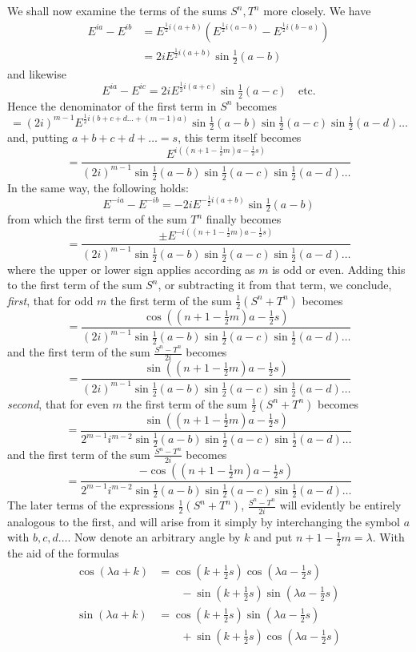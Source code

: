 We shall now examine the terms of the sums $S^n,T^n$ more closely. We have
\[
\begin{aligned}E^{ia}-E^{ib}&=E^{\frac12i(a+b)}(E^{\frac12i(a-b)}-E^{\frac12i(b-a)})\\
&=2iE^{\frac12i(a+b)}\sin\tfrac12(a-b)\end{aligned}
\]
and likewise
\[
E^{ia}-E^{ic}=2iE^{\frac12i(a+c)}\sin\tfrac12(a-c)\quad\text{etc.}
\]
Hence the denominator of the first term in $S^n$ becomes
\[
=(2i)^{m-1}E^{\frac12i(b+c+d\ldots+(m-1)a)}\sin\tfrac12(a-b)\sin\tfrac12(a-c)\sin\tfrac12(a-d)\ldots
\]
and, putting $a+b+c+d+\ldots=s$, this term itself becomes
\[
=\frac{E^{i((n+1-\frac12m)a-\frac12s)}}{(2i)^{m-1}\sin\tfrac12(a-b)\sin\tfrac12(a-c)\sin\tfrac12(a-d)\ldots}
\]
In the same way, the following holds:
\[
E^{-ia}-E^{-ib}=-2iE^{-\frac12i(a+b)}\sin\tfrac12(a-b)
\]
from which the first term of the sum $T^n$ finally becomes
\[
=\frac{\pm E^{-i((n+1-\frac12m)a-\frac12s)}}{(2i)^{m-1}\sin\tfrac12(a-b)\sin\tfrac12(a-c)\sin\tfrac12(a-d)\ldots}
\]
where the upper or lower sign applies according as $m$ is odd or even. Adding this to the first term of the sum $S^n$, or subtracting it from that term, we conclude, \textit{first}, that for odd $m$ the first term of the sum $\frac12(S^n+T^n)$ becomes
\[
=\frac{\cos((n+1-\frac12m)a-\frac12s)}{(2i)^{m-1}\sin\tfrac12(a-b)\sin\tfrac12(a-c)\sin\tfrac12(a-d)\ldots}
\]
and the first term of the sum $\frac{S^n-T^n}{2i}$ becomes
\[
=\frac{\sin((n+1-\frac12m)a-\frac12s)}{(2i)^{m-1}\sin\tfrac12(a-b)\sin\tfrac12(a-c)\sin\tfrac12(a-d)\ldots}
\]
\textit{second}, that for even $m$ the first term of the sum $\frac12(S^n+T^n)$ becomes
\[
=\frac{\sin((n+1-\frac12m)a-\frac12s)}{2^{m-1}i^{m-2}\sin\tfrac12(a-b)\sin\tfrac12(a-c)\sin\tfrac12(a-d)\ldots}
\]
and the first term of the sum $\frac{S^n-T^n}{2i}$ becomes
\[
=\frac{-\cos((n+1-\frac12m)a-\frac12s)}{2^{m-1}i^{m-2}\sin\tfrac12(a-b)\sin\tfrac12(a-c)\sin\tfrac12(a-d)\ldots}
\]
The later terms of the expressions $\frac12(S^n+T^n)$, $\frac{S^n-T^n}{2i}$ will evidently be entirely analogous to the first, and will arise from it simply by interchanging the symbol $a$ with $b,c,d\ldots$. Now denote an arbitrary angle by $k$ and put $n+1-\frac12m=\lambda$. With the aid of the formulas
\[
\begin{aligned}
\cos(\lambda a+k)&=\cos(k+\tfrac12s)\cos(\lambda a-\tfrac12s)\\&\qquad-\sin(k+\tfrac12s)\sin(\lambda a-\tfrac12s)\\
\sin(\lambda a+k)&=\cos(k+\tfrac12s)\sin(\lambda a-\tfrac12s)\\&\qquad+\sin(k+\tfrac12s)\cos(\lambda a-\tfrac12s)
\end{aligned}
\]
